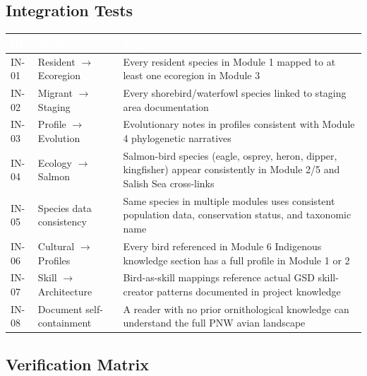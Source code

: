 \documentclass[11pt,letterpaper]{article}
\newcommand{\tableheader}[1]{\textbf{\sffamily\textcolor{white}{#1}}}
\begin{document}
\subsection{Integration Tests}

\begin{center}
\begin{tabularx}{\textwidth}{C{1.2cm}L{3cm}X}
\toprule
{}
\tableheader{ID} & \tableheader{Verifies} & \tableheader{Expected} \\
\midrule
IN-01 & Resident $\rightarrow$ Ecoregion & Every resident species in Module 1 mapped to at least one ecoregion in Module 3 \\
IN-02 & Migrant $\rightarrow$ Staging & Every shorebird/waterfowl species linked to staging area documentation \\
IN-03 & Profile $\rightarrow$ Evolution & Evolutionary notes in profiles consistent with Module 4 phylogenetic narratives \\
IN-04 & Ecology $\rightarrow$ Salmon & Salmon-bird species (eagle, osprey, heron, dipper, kingfisher) appear consistently in Module 2/5 and Salish Sea cross-links \\
IN-05 & Species data consistency & Same species in multiple modules uses consistent population data, conservation status, and taxonomic name \\
IN-06 & Cultural $\rightarrow$ Profiles & Every bird referenced in Module 6 Indigenous knowledge section has a full profile in Module 1 or 2 \\
IN-07 & Skill $\rightarrow$ Architecture & Bird-as-skill mappings reference actual GSD skill-creator patterns documented in project knowledge \\
IN-08 & Document self-containment & A reader with no prior ornithological knowledge can understand the full PNW avian landscape \\
\bottomrule
\end{tabularx}
\end{center}

\subsection{Verification Matrix}
\end{document}
